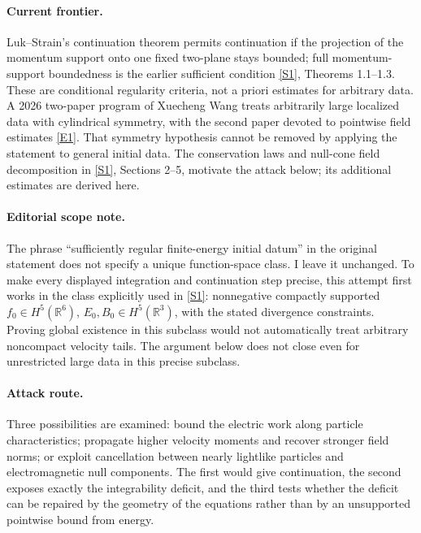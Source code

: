 \documentclass[11pt,a4paper]{article}
\newcommand{\R}{\mathbb{R}}
\newcommand{\sref}[2]{\hyperlink{source:#1:#2}{[S#2]}}
\newcommand{\eref}[2]{\hyperlink{extra:#1:#2}{[E#2]}}
\begin{document}
\paragraph{Current frontier.}
Luk--Strain's continuation theorem permits continuation if the projection
of the momentum support onto one fixed two-plane stays bounded; full
momentum-support boundedness is the earlier sufficient condition
\sref{214}{1}, Theorems 1.1--1.3. These are conditional regularity criteria,
not a priori estimates for arbitrary data. A 2026 two-paper program of
Xuecheng Wang treats arbitrarily large localized data with cylindrical
symmetry, with the second paper devoted to pointwise field estimates
\eref{214}{1}. That symmetry hypothesis cannot be removed by applying the
statement to general initial data. The conservation laws and null-cone
field decomposition in \sref{214}{1}, Sections 2--5, motivate the attack
below; its additional estimates are derived here.

\paragraph{Editorial scope note.}
The phrase ``sufficiently regular finite-energy initial datum'' in the
original statement does not specify a unique function-space class. I leave
it unchanged. To make every displayed integration and continuation step
precise, this attempt first works in the class explicitly used in
\sref{214}{1}: nonnegative compactly supported $f_0\in H^5(\R^6)$,
$E_0,B_0\in H^5(\R^3)$, with the stated divergence constraints. Proving
global existence in this subclass would not automatically treat arbitrary
noncompact velocity tails. The argument below does not close even for
unrestricted large data in this precise subclass.

\paragraph{Attack route.}
Three possibilities are examined: bound the electric work along particle
characteristics; propagate higher velocity moments and recover stronger
field norms; or exploit cancellation between nearly lightlike particles
and electromagnetic null components. The first would give continuation,
the second exposes exactly the integrability deficit, and the third tests
whether the deficit can be repaired by the geometry of the equations rather
than by an unsupported pointwise bound from energy.
\end{document}
